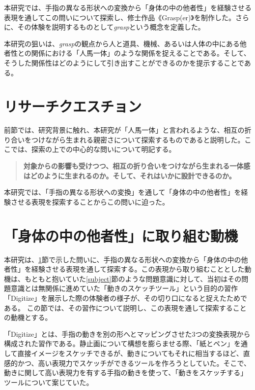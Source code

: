 本研究では、手指の異なる形状への変換から「身体の中の他者性」を経験させる表現を通してこの問いについて探索し、修士作品《Grasp(er)》を制作した。さらに、その体験を説明するものとして\textit{grasp}という概念を定義した。

本研究の狙いは、\textit{grasp}の観点から人と道具、機械、あるいは人体の中にある他者性との関係における「人馬一体」のような関係を捉えることである。そして、そうした関係性はどのようにして引き出すことができるのかを提示することである。

\section{リサーチクエスチョン}
\label{research_question}
前節では、研究背景に触れ、本研究が「人馬一体」と言われるような、相互の折り合いをつけながら生まれる親密さについて探索するものであると説明した。ここでは、探索の上での中心的な問いについて明記する。

\begin{quote}
\textbf{対象からの影響も受けつつ、相互の折り合いをつけながら生まれる一体感はどのように生まれるのか。そして、それはいかに設計できるのか。}
\end{quote}

本研究では、「手指の異なる形状への変換」を通して「身体の中の他者性」を経験させる表現を探索することからこの問いに迫った。

\section{「身体の中の他者性」に取り組む動機}
\label{prototyping_concept_making}
本研究は、\ref{research_question}節で示した問いに、手指の異なる形状への変換から「身体の中の他者性」を経験させる表現を通して探索する。この表現から取り組むこととした動機は、もともと抱いていた\ref{subject}節のような問題意識に対して、当初はその問題意識とは無関係に進めていた「動きのスケッチツール」という目的の習作「Digitize」を展示した際の体験者の様子が、その切り口になると捉えたためである。
この節では、その習作について説明し、この表現を通して探索することの動機とする。

「Digitize」とは、手指の動きを別の形へとマッピングさせた3つの変換表現から構成された習作である。静止画について構想を膨らませる際、「紙とペン」を通して直接イメージをスケッチできるが、動きについてもそれに相当するほど、直感的かつ、高い表現力でスケッチができるツールを作ろうとしていた。そこで、動きに関して高い表現力を有する手指の動きを使って、「動きをスケッチする」ツールについて案じていた。

